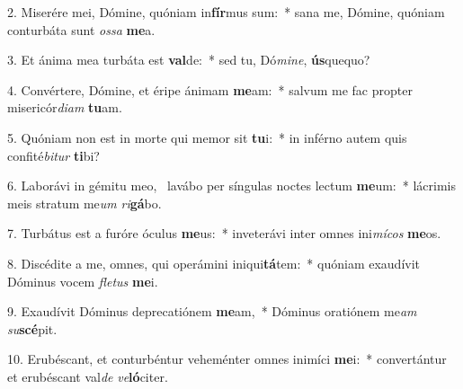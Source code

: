 2. Miserére mei, Dómine, quóniam in\textbf{fír}mus sum:~*  sana me, Dómine, quóniam conturbáta sunt \textit{os}\textit{sa} \textbf{me}a.\

3. Et ánima mea turbáta est \textbf{val}de:~*  sed tu, Dó\textit{mi}\textit{ne}, \textbf{ús}quequo?\

4. Convértere, Dómine, et éripe ánimam \textbf{me}am:~*  salvum me fac propter misericór\textit{di}\textit{am} \textbf{tu}am.\

5. Quóniam non est in morte qui memor sit \textbf{tu}i:~*  in inférno autem quis confité\textit{bi}\textit{tur} \textbf{ti}bi?\

6. Laborávi in gémitu meo, \dag\  lavábo per síngulas noctes lectum \textbf{me}um:~*  lácrimis meis stratum me\textit{um} \textit{ri}\textbf{gá}bo.\

7. Turbátus est a furóre óculus \textbf{me}us:~*  inveterávi inter omnes ini\textit{mí}\textit{cos} \textbf{me}os.\

8. Discédite a me, omnes, qui operámini iniqui\textbf{tá}tem:~*  quóniam exaudívit Dóminus vocem \textit{fle}\textit{tus} \textbf{me}i.\

9. Exaudívit Dóminus deprecatiónem \textbf{me}am,~*  Dóminus oratiónem me\textit{am} \textit{su}\textbf{scé}pit.\

10. Erubéscant, et conturbéntur veheménter omnes inimíci \textbf{me}i:~*  convertántur et erubéscant val\textit{de} \textit{ve}\textbf{ló}citer.\

